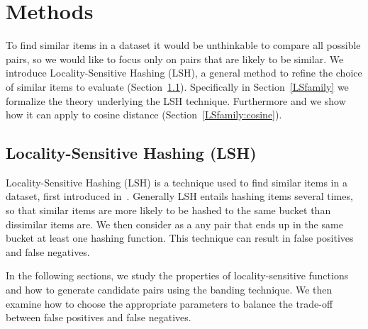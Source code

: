 \chapter{Methods} \label{methods}
To find similar items in a dataset it would be unthinkable to compare all possible pairs, so we would like to focus only on pairs that are likely to be similar. We introduce Locality-Sensitive Hashing (LSH), a general method to refine the choice of similar items to evaluate (Section~\ref{LSH}). Specifically in Section~\ref{LSfamily} we formalize the theory underlying the LSH technique. Furthermore and we show how it can apply to cosine distance (Section~\ref{LSfamily:cosine}).

\section{Locality-Sensitive Hashing (LSH)}\label{LSH}
Locality-Sensitive Hashing (LSH) is a technique used to find similar items in a dataset, first introduced in~\cite{Indyk1998approximate}\cite{Gionis1999similarity}.
Generally LSH entails hashing items several times, so that similar items are more likely to be hashed to the same bucket than dissimilar items are. We then consider as a  any pair that ends up in the same bucket at least one hashing function. This technique can result in false positives and false negatives.

\medskip
In the following sections, we study the properties of locality-sensitive functions and how to generate candidate pairs using the banding technique. We then examine how to choose the appropriate parameters to balance the trade-off between false positives and false negatives.

